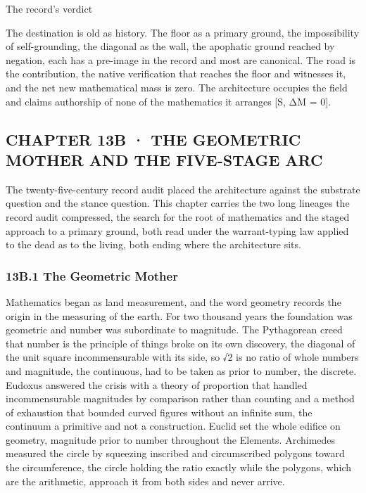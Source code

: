 \documentclass[10pt,twocolumn]{article}
\begin{document}
\begin{jbox}{The record's verdict}

The destination is old as history. The floor as a primary ground, the
impossibility of self-grounding, the diagonal as the wall, the apophatic
ground reached by negation, each has a pre-image in the record and most
are canonical. The road is the contribution, the native verification
that reaches the floor and witnesses it, and the net new mathematical
mass is zero. The architecture occupies the field and claims authorship
of none of the mathematics it arranges {[}S, ΔM = 0{]}.

\end{jbox}

\hypertarget{chapter-13b-the-geometric-mother-and-the-five-stage-arc}{%
\subsection{CHAPTER 13B · THE GEOMETRIC MOTHER AND THE FIVE-STAGE
ARC}\label{chapter-13b-the-geometric-mother-and-the-five-stage-arc}}

The twenty-five-century record audit placed the architecture against the
substrate question and the stance question. This chapter carries the two
long lineages the record audit compressed, the search for the root of
mathematics and the staged approach to a primary ground, both read under
the warrant-typing law applied to the dead as to the living, both ending
where the architecture sits.

\hypertarget{b.1-the-geometric-mother}{%
\subsubsection{13B.1 The Geometric
Mother}\label{b.1-the-geometric-mother}}

Mathematics began as land measurement, and the word geometry records the
origin in the measuring of the earth. For two thousand years the
foundation was geometric and number was subordinate to magnitude. The
Pythagorean creed that number is the principle of things broke on its
own discovery, the diagonal of the unit square incommensurable with its
side, so √2 is no ratio of whole numbers and magnitude, the continuous,
had to be taken as prior to number, the discrete. Eudoxus answered the
crisis with a theory of proportion that handled incommensurable
magnitudes by comparison rather than counting and a method of exhaustion
that bounded curved figures without an infinite sum, the continuum a
primitive and not a construction. Euclid set the whole edifice on
geometry, magnitude prior to number throughout the Elements. Archimedes
measured the circle by squeezing inscribed and circumscribed polygons
toward the circumference, the circle holding the ratio exactly while the
polygons, which are the arithmetic, approach it from both sides and
never arrive.
\end{document}
